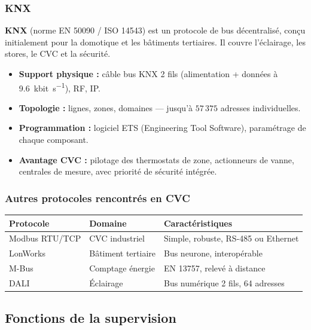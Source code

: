 \subsubsection{KNX}

\begin{definition}
  \textbf{KNX} (norme EN 50090 / ISO 14543) est un protocole de bus décentralisé, conçu initialement pour la domotique et les bâtiments tertiaires. Il couvre l'éclairage, les stores, le CVC et la sécurité.
\end{definition}

\begin{itemize}
  \item \textbf{Support physique :} câble bus KNX 2 fils (alimentation + données à \SI{9.6}{\kilo bit\per\second}), RF, IP.
  \item \textbf{Topologie :} lignes, zones, domaines — jusqu'à $57\,375$ adresses individuelles.
  \item \textbf{Programmation :} logiciel ETS (Engineering Tool Software), paramétrage de chaque composant.
  \item \textbf{Avantage CVC :} pilotage des thermostats de zone, actionneurs de vanne, centrales de mesure, avec priorité de sécurité intégrée.
\end{itemize}

\subsubsection{Autres protocoles rencontrés en CVC}

\begin{center}
\begin{tabular}{lll}
  \toprule
  Protocole & Domaine & Caractéristiques \\
  \midrule
  Modbus RTU/TCP & CVC industriel & Simple, robuste, RS-485 ou Ethernet \\
  LonWorks & Bâtiment tertiaire & Bus neurone, interopérable \\
  M-Bus & Comptage énergie & EN 13757, relevé à distance \\
  DALI & Éclairage & Bus numérique 2 fils, 64 adresses \\
  \bottomrule
\end{tabular}
\end{center}

\subsection{Fonctions de la supervision}

